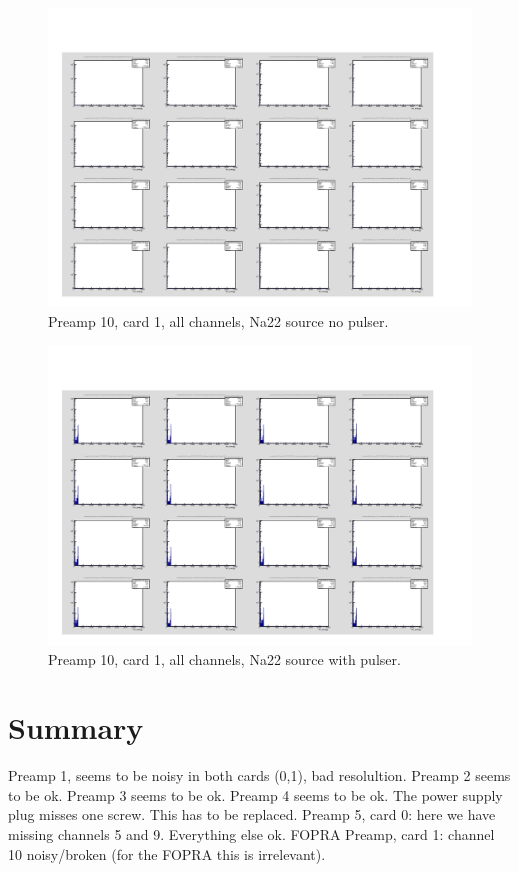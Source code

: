 \documentclass{report}
\begin{document}
\begin{figure}[!htb]
  \includegraphics[width=\linewidth]{small_box_card1_all_nopulser.png}
  \caption{Preamp 10, card 1, all channels, Na22 source  no pulser.}
\end{figure}
\begin{figure}[!htb]
  \includegraphics[width=\linewidth]{small_box_card1_all.png}
  \caption{Preamp 10, card 1, all channels, Na22 source with pulser.}
\end{figure}
\newpage
\clearpage



\section{Summary}
Preamp 1, seems to be noisy in both cards (0,1), bad resolultion.\newline
Preamp 2 seems to be ok.\newline
Preamp 3 seems to be ok.\newline
Preamp 4 seems to be ok. The power supply plug misses one screw. This has to be replaced.\newline
Preamp 5, card 0: here we have missing channels 5 and 9. Everything else ok.\newline
FOPRA Preamp, card 1: channel 10 noisy/broken (for the FOPRA this is irrelevant).\newline
\end{document}

